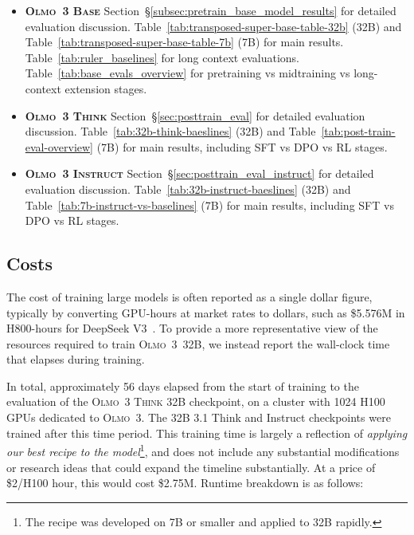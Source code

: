 \documentclass[table]{ai2style/ai2}
\newcommand{\newOlmo}{Olmo\xspace}
\newcommand{\olmothree}{\textsc{\newOlmo~3}\xspace}
\newcommand{\olmothreebase}{\textsc{\newOlmo~3 Base}\xspace}
\newcommand{\olmothreeinstruct}{\textsc{\newOlmo~3 Instruct}\xspace}
\newcommand{\olmothreethinking}{\textsc{Olmo~3 Think}\xspace}
\begin{document}
\begin{itemize}
    \item {\bf{\olmothreebase}} Section~\S\ref{subsec:pretrain_base_model_results} for detailed evaluation discussion. Table~\ref{tab:transposed-super-base-table-32b} (32B) and Table~\ref{tab:transposed-super-base-table-7b} (7B) for main results. Table~\ref{tab:ruler_baselines} for long context evaluations. Table~\ref{tab:base_evals_overview} for pretraining vs midtraining vs long-context extension stages.
    \item {\bf{\olmothreethinking}} Section~\S\ref{sec:posttrain_eval} for detailed evaluation discussion. Table~\ref{tab:32b-think-baeslines} (32B) and Table~\ref{tab:post-train-eval-overview} (7B) for main results, including SFT vs DPO vs RL stages.
    \item {\bf{\olmothreeinstruct}} Section~\S\ref{sec:posttrain_eval_instruct} for detailed evaluation discussion. Table~\ref{tab:32b-instruct-baeslines} (32B) and Table~\ref{tab:7b-instruct-vs-baselines} (7B) for main results, including SFT vs DPO vs RL stages.
\end{itemize}

\subsection{Costs} 

The cost of training large models is often reported as a single dollar figure, typically by converting GPU-hours at market rates to dollars, such as \$5.576M in H800-hours for DeepSeek V3~\citep{deepseekv3}.
To provide a more representative view of the resources required to train \olmothree~32B, we instead report the wall-clock time that elapses during training.

In total, approximately 56 days elapsed from the start of training to the evaluation of the \olmothreethinking 32B checkpoint, on a cluster with 1024 H100 GPUs dedicated to \olmothree. 
The 32B 3.1 Think and Instruct checkpoints were trained after this time period.
This training time is largely a reflection of \textit{applying our best recipe to the model}\footnote{The recipe was developed on 7B or smaller and applied to 32B rapidly.}, and does not include any substantial modifications or research ideas that could expand the timeline substantially.
At a price of \$2/H100 hour, this would cost \$2.75M. Runtime breakdown is as follows:
\end{document}
